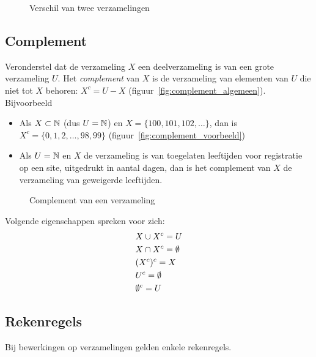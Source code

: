 \begin{figure}[htbp]
\centering
{}\qquad
\subfloat[$\{1,2,3,4\}-\{ 3,4,5,6\}=\{1,2\}$]{
    
    \label{fig:verschil_voorbeeld}
}
\caption{Verschil van twee verzamelingen}
\end{figure}

\subsection{Complement}
Veronderstel dat de verzameling $X$ een deelverzameling is van een grote verzameling $U$. Het \emph{complement}  van $X$ is de verzameling van elementen van $U$ die niet tot $X$ behoren: $X^c=U-X$ (figuur~\ref{fig:complement_algemeen}). Bijvoorbeeld
\begin{itemize}
\item Als $X\subset \mathbb{N}$ (dus $U=\nat$) en $X=\{100,101,102,\dots\}$, dan is $X^c=\{0,1,2,\dots,98,99\}$ (figuur~\ref{fig:complement_voorbeeld})
\item Als $U=\nat$ en $X$ de verzameling is van toegelaten leeftijden voor registratie op een site, uitgedrukt in aantal dagen, dan is het complement van $X$ de verzameling van geweigerde leeftijden.
\end{itemize}

\begin{figure}
\centering
{}\qquad
\subfloat[$ \{100,101,102,\dots\}^c=\{0,1,2,\dots,98,99\}$ als $U=\nat$]{
    
    \label{fig:complement_voorbeeld}
}
\caption{Complement van een verzameling}
\end{figure}
Volgende eigenschappen spreken voor zich:
\begin{equation*}
\begin{split}
&X\cup X^c=U \\
&X\cap X^c=\emptyset\\
&(X^c)^c=X\\
& U^c=\emptyset \\
&\emptyset^c=U
\end{split}
\end{equation*}

\subsection{Rekenregels}
\label{subsec:verzRekenregels}
Bij bewerkingen op verzamelingen gelden enkele rekenregels.

